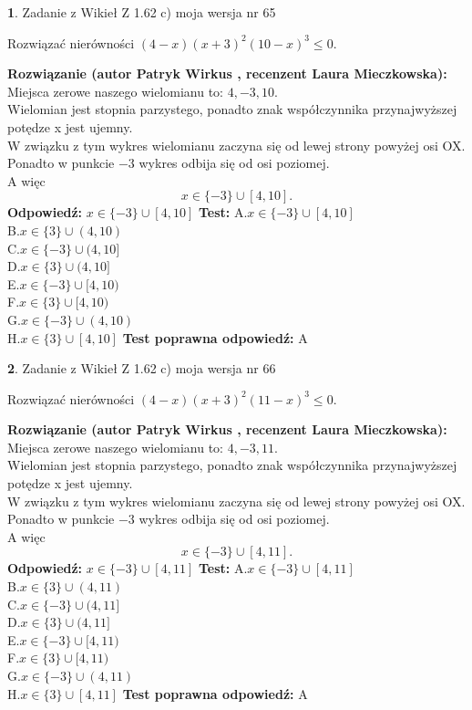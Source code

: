 \documentclass[12pt, a4paper]{article}
\theoremstyle{definition} %
\newtheorem{zad}{}
\newcommand{\zadStart}[1]{\begin{zad}#1\newline}
\newcommand{\zadStop}{\end{zad}}
\newcommand{\rozwStart}[2]{\noindent \textbf{Rozwiązanie (autor #1 , recenzent #2): }\newline}
\newcommand{\rozwStop}{\newline}
\newcommand{\odpStart}{\noindent \textbf{Odpowiedź:}\newline}
\newcommand{\odpStop}{\newline}
\newcommand{\testStart}{\noindent \textbf{Test:}\newline}
\newcommand{\testStop}{\newline}
\newcommand{\kluczStart}{\noindent \textbf{Test poprawna odpowiedź:}\newline}
\newcommand{\kluczStop}{\newline}
\begin{document}
\zadStart{Zadanie z Wikieł Z 1.62 c) moja wersja nr 65}

Rozwiązać nierówności $(4-x)(x+3)^{2}(10-x)^{3}\le0$.
\zadStop
\rozwStart{Patryk Wirkus}{Laura Mieczkowska}
Miejsca zerowe naszego wielomianu to: $4, -3, 10$.\\
Wielomian jest stopnia parzystego, ponadto znak współczynnika przy\linebreak najwyższej potędze x jest ujemny.\\ W związku z tym wykres wielomianu zaczyna się od lewej strony powyżej osi OX.\\
Ponadto w punkcie $-3$ wykres odbija się od osi poziomej.\\
A więc $$x \in \{-3\} \cup [4,10].$$
\rozwStop
\odpStart
$x \in \{-3\} \cup [4,10]$
\odpStop
\testStart
A.$x \in \{-3\} \cup [4,10]$\\
B.$x \in \{3\} \cup (4,10)$\\
C.$x \in \{-3\} \cup (4,10]$\\
D.$x \in \{3\} \cup (4,10]$\\
E.$x \in \{-3\} \cup [4,10)$\\
F.$x \in \{3\} \cup [4,10)$\\
G.$x \in \{-3\} \cup (4,10)$\\
H.$x \in \{3\} \cup [4,10]$
\testStop
\kluczStart
A
\kluczStop



\zadStart{Zadanie z Wikieł Z 1.62 c) moja wersja nr 66}

Rozwiązać nierówności $(4-x)(x+3)^{2}(11-x)^{3}\le0$.
\zadStop
\rozwStart{Patryk Wirkus}{Laura Mieczkowska}
Miejsca zerowe naszego wielomianu to: $4, -3, 11$.\\
Wielomian jest stopnia parzystego, ponadto znak współczynnika przy\linebreak najwyższej potędze x jest ujemny.\\ W związku z tym wykres wielomianu zaczyna się od lewej strony powyżej osi OX.\\
Ponadto w punkcie $-3$ wykres odbija się od osi poziomej.\\
A więc $$x \in \{-3\} \cup [4,11].$$
\rozwStop
\odpStart
$x \in \{-3\} \cup [4,11]$
\odpStop
\testStart
A.$x \in \{-3\} \cup [4,11]$\\
B.$x \in \{3\} \cup (4,11)$\\
C.$x \in \{-3\} \cup (4,11]$\\
D.$x \in \{3\} \cup (4,11]$\\
E.$x \in \{-3\} \cup [4,11)$\\
F.$x \in \{3\} \cup [4,11)$\\
G.$x \in \{-3\} \cup (4,11)$\\
H.$x \in \{3\} \cup [4,11]$
\testStop
\kluczStart
A
\kluczStop
\end{document}
